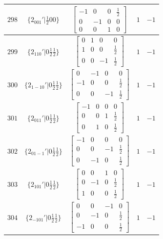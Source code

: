\documentclass[fleqn,8pt]{jsarticle}
\begin{document}
\begin{longtable}{ccccc}
$ 298 $ & $ \{2{}_{001}{}'|\frac{1}{2} 0 0\} $ & $ \begin{bmatrix} -1 & 0 & 0 & \frac{1}{2} \\ 0 & -1 & 0 & 0 \\ 0 & 0 & 1 & 0 \end{bmatrix} $ & $ 1 $ & $ -1 $ \\ \hline
$ 299 $ & $ \{2{}_{110}{}'|0 \frac{1}{2} \frac{1}{2}\} $ & $ \begin{bmatrix} 0 & 1 & 0 & 0 \\ 1 & 0 & 0 & \frac{1}{2} \\ 0 & 0 & -1 & \frac{1}{2} \end{bmatrix} $ & $ 1 $ & $ -1 $ \\ \hline
$ 300 $ & $ \{2{}_{1-10}{}'|0 \frac{1}{2} \frac{1}{2}\} $ & $ \begin{bmatrix} 0 & -1 & 0 & 0 \\ -1 & 0 & 0 & \frac{1}{2} \\ 0 & 0 & -1 & \frac{1}{2} \end{bmatrix} $ & $ 1 $ & $ -1 $ \\ \hline
$ 301 $ & $ \{2{}_{011}{}'|0 \frac{1}{2} \frac{1}{2}\} $ & $ \begin{bmatrix} -1 & 0 & 0 & 0 \\ 0 & 0 & 1 & \frac{1}{2} \\ 0 & 1 & 0 & \frac{1}{2} \end{bmatrix} $ & $ 1 $ & $ -1 $ \\ \hline
$ 302 $ & $ \{2{}_{01-1}{}'|0 \frac{1}{2} \frac{1}{2}\} $ & $ \begin{bmatrix} -1 & 0 & 0 & 0 \\ 0 & 0 & -1 & \frac{1}{2} \\ 0 & -1 & 0 & \frac{1}{2} \end{bmatrix} $ & $ 1 $ & $ -1 $ \\ \hline
$ 303 $ & $ \{2{}_{101}{}'|0 \frac{1}{2} \frac{1}{2}\} $ & $ \begin{bmatrix} 0 & 0 & 1 & 0 \\ 0 & -1 & 0 & \frac{1}{2} \\ 1 & 0 & 0 & \frac{1}{2} \end{bmatrix} $ & $ 1 $ & $ -1 $ \\ \hline
$ 304 $ & $ \{2{}_{-101}{}'|0 \frac{1}{2} \frac{1}{2}\} $ & $ \begin{bmatrix} 0 & 0 & -1 & 0 \\ 0 & -1 & 0 & \frac{1}{2} \\ -1 & 0 & 0 & \frac{1}{2} \end{bmatrix} $ & $ 1 $ & $ -1 $ \\ \hline

\end{longtable}
\end{document}
